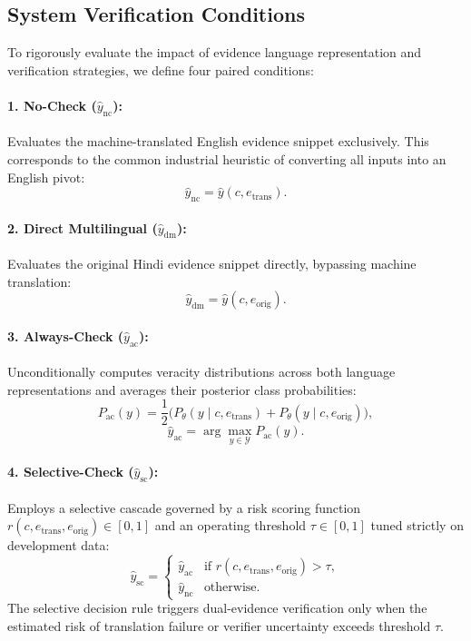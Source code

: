 \subsection{System Verification Conditions}
To rigorously evaluate the impact of evidence language representation and verification strategies, we define four paired conditions:

\paragraph{1. No-Check ($\hat{y}_{\text{nc}}$):}
Evaluates the machine-translated English evidence snippet exclusively. This corresponds to the common industrial heuristic of converting all inputs into an English pivot:
\begin{equation}
    \hat{y}_{\text{nc}} = \hat{y}(c, e_{\text{trans}}).
\end{equation}

\paragraph{2. Direct Multilingual ($\hat{y}_{\text{dm}}$):}
Evaluates the original Hindi evidence snippet directly, bypassing machine translation:
\begin{equation}
    \hat{y}_{\text{dm}} = \hat{y}(c, e_{\text{orig}}).
\end{equation}

\paragraph{3. Always-Check ($\hat{y}_{\text{ac}}$):}
Unconditionally computes veracity distributions across both language representations and averages their posterior class probabilities:
\begin{equation}
    P_{\text{ac}}(y) = \frac{1}{2}\Big(P_\theta(y \mid c, e_{\text{trans}}) + P_\theta(y \mid c, e_{\text{orig}})\Big),
\end{equation}
\begin{equation}
    \hat{y}_{\text{ac}} = \arg\max_{y \in \mathcal{Y}} P_{\text{ac}}(y).
\end{equation}

\paragraph{4. Selective-Check ($\hat{y}_{\text{sc}}$):}
Employs a selective cascade governed by a risk scoring function $r(c, e_{\text{trans}}, e_{\text{orig}}) \in [0, 1]$ and an operating threshold $\tau \in [0, 1]$ tuned strictly on development data:
\begin{equation}
    \hat{y}_{\text{sc}} = \begin{cases}
        \hat{y}_{\text{ac}} & \text{if } r(c, e_{\text{trans}}, e_{\text{orig}}) > \tau, \\
        \hat{y}_{\text{nc}} & \text{otherwise}.
    \end{cases}
\end{equation}
The selective decision rule triggers dual-evidence verification only when the estimated risk of translation failure or verifier uncertainty exceeds threshold $\tau$.

